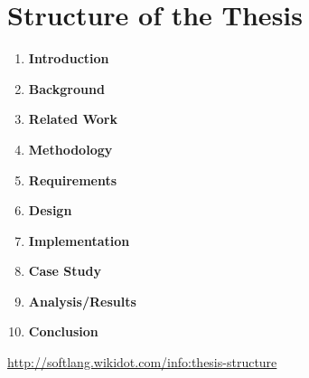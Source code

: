 \documentclass[runningheads,a4paper]{llncs}
\begin{document}
\section{Structure of the Thesis}

\begin{enumerate}

\item
\textbf{Introduction}

\item
\textbf{Background}

\item
\textbf{Related Work}

\item
\textbf{Methodology}

\item
\textbf{Requirements}

\item
\textbf{Design}

\item
\textbf{Implementation}

\item
\textbf{Case Study}

\item
\textbf{Analysis/Results}

\item
\textbf{Conclusion}

\end{enumerate}

\url{http://softlang.wikidot.com/info:thesis-structure}

\cite{DBLP:conf/ecmdafa/LammelV14}
\cite{DBLP:conf/models/FavreLV12}
\cite{DBLP:journals/dke/Varzi96}
\cite{DBLP:journals/entcs/FavreN05}
\cite{Softlang:course/ptt15/technoloymodeling}
\cite{DBLP:conf/sle/Lammel16}


{}
\end{document}
